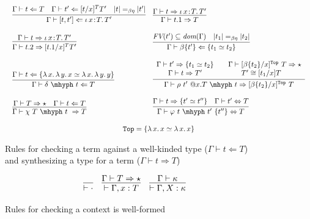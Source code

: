 \documentclass{article}
\newcommand{\abs}[4]{{#1}\, #2\! : \! #3.\, #4}
\newcommand{\absu}[3]{{#1}\, #2.\, #3}
\newcommand{\tpcheck}[0]{\Leftarrow}
\newcommand{\tpsynth}[0]{\Rightarrow}
\begin{document}
\begin{figure}
\[\begin{array}{c}
\begin{array}{ll}
    \infer{\Gamma\vdash [ t , t' ] \tpcheck \abs{\iota}{x}{T}{T'}}
          {\Gamma\vdash t \tpcheck T & \Gamma\vdash t' \tpcheck [t/x]^TT' & |t| =_{\beta\eta} |t'|} &
    \infer{\Gamma\vdash t.1 \tpsynth T}{\Gamma\vdash t \tpsynth \abs{\iota}{x}{T}{T'}} \\ \\
    \infer{\Gamma\vdash t.2 \tpsynth [t.1/x]^TT'}{\Gamma\vdash t \tpsynth \abs{\iota}{x}{T}{T'}} &
    \infer{\Gamma\vdash \beta\{t'\} \tpcheck \{ t_1 \simeq t_2 \}}
          {\textit{FV}(t')\subseteq \textit{dom}(\Gamma) \quad |t_1| =_{\beta\eta} |t_2|}  \\ \\    
    \infer{\Gamma\vdash \delta\ \mhyph\ t \tpcheck T}{\Gamma\vdash t\tpcheck \{ \absu{\lambda}{x}{\absu{\lambda}{y}{x}} \simeq \absu{\lambda}{x}{\absu{\lambda}{y}{y}}\}}  &
    \infer{\Gamma \vdash \rho\ t'\ @x.T\ \mhyph\ t \tpsynth [\beta\{t_2\}/x]^{\texttt{Top}}\ T}
          {
          \begin{array}{cc}
            \Gamma \vdash t' \tpsynth \{t_1 \simeq t_2\}
            & \quad \Gamma \vdash [\beta\{t_2\}/x]^{\texttt{Top}}\ T \tpsynth \star
            \\ \Gamma \vdash t \tpsynth T'
            & T' \cong [t_1/x]T
          \end{array}
          } \\ \\
    \infer{\Gamma \vdash \chi\ T\ \mhyph\ t\ \tpsynth T}
          {\Gamma \vdash T \tpsynth \star & \Gamma \vdash t \tpcheck T} &
    \infer{\Gamma\vdash \varphi\ t\ \mhyph\ t'\ \{t''\} \Leftrightarrow T}
          {\Gamma\vdash t\tpsynth \{t'\simeq t''\} & \Gamma\vdash t' \Leftrightarrow T}
  \end{array}
      \\ \\
      \texttt{Top} = \{\absu{\lambda}{x}{x} \simeq \absu{\lambda}{x}{x} \}
    \end{array}
  \]
\caption{Rules for checking a term against a well-kinded type ($\Gamma \vdash t \tpcheck T$)
           and synthesizing a type for a term ($\Gamma \vdash t \tpsynth T$)}
\label{fig:tp}
\end{figure}

\begin{figure}
  \centering
  \[
    \begin{array}{lll}
      \infer{\vdash \cdot}{}
      & \infer{
        \vdash \Gamma,x:T
        }{\Gamma \vdash T \tpsynth \star}
      & \infer{
        \vdash \Gamma,X:\kappa
        }{
        \Gamma \vdash \kappa
        }
    \end{array}
  \]
  \caption{Rules for checking a context is well-formed}
  \label{fig:ctxt}
\end{figure}
\end{document}
